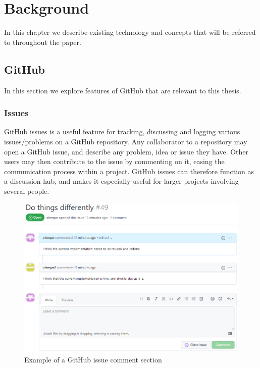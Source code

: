 
\chapter{Background}
\label{ch:background}

In this chapter we describe existing technology and concepts that will be referred to throughout the paper.

\section{GitHub}

In this section we explore features of GitHub that are relevant to this thesis.

\subsection{Issues}

GitHub issues is a useful feature for tracking, discussing and logging various issues/problems on a GitHub repository.
Any collaborator to a repository may open a GitHub issue, and describe any problem, idea or issue they have.
Other users may then contribute to the issue by commenting on it, easing the communication process within a project.
GitHub issues can therefore function as a discussion hub, and makes it especially useful for larger projects involving several people. 

\begin{figure}[ht]
    \centering
    \includegraphics[width=\textwidth]{photos/github-issue.PNG}
    \caption{Example of a GitHub issue comment section}
    \label{fig:github-issue}
\end{figure}

